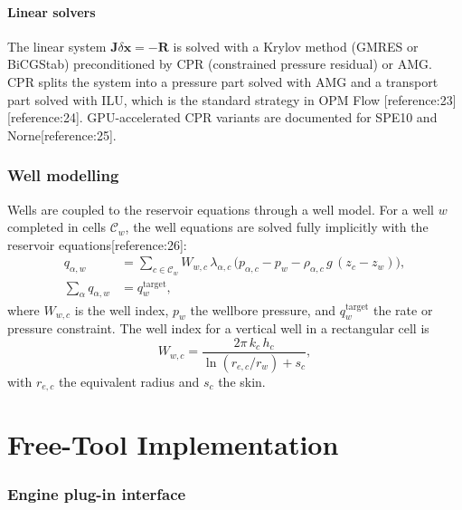 \documentclass[10pt,a4paper]{article}
\begin{document}
\subsection{Linear solvers}

The linear system $\bm{J}\delta\bm{x}=-\bm{R}$ is solved with a Krylov method
(GMRES or BiCGStab) preconditioned by CPR (constrained pressure residual) or
AMG. CPR splits the system into a pressure part solved with AMG and a
transport part solved with ILU, which is the standard strategy in OPM Flow
[reference:23][reference:24]. GPU-accelerated CPR variants are documented for
SPE10 and Norne[reference:25].

\section{Well modelling}

Wells are coupled to the reservoir equations through a well model. For a well
$w$ completed in cells $\mathcal{C}_w$, the well equations are solved fully
implicitly with the reservoir equations[reference:26]:
\begin{align}
  q_{\alpha,w} &= \sum_{c\in\mathcal{C}_w} W_{w,c}\,\lambda_{\alpha,c}\,
  \bigl(p_{\alpha,c} - p_{w} - \rho_{\alpha,c}\,g\,(z_c-z_w)\bigr), \label{eq:well-rate}\\
  \sum_{\alpha} q_{\alpha,w} &= q_{w}^{\mathrm{target}}, \label{eq:well-constraint}
\end{align}
where $W_{w,c}$ is the well index, $p_w$ the wellbore pressure, and
$q_w^{\mathrm{target}}$ the rate or pressure constraint. The well index for a
vertical well in a rectangular cell is
\begin{equation}
  W_{w,c} = \frac{2\pi\,k_c\,h_c}
  {\ln(r_{e,c}/r_w) + s_c},
  \label{eq:well-index}
\end{equation}
with $r_{e,c}$ the equivalent radius and $s_c$ the skin.

\part{Free-Tool Implementation}

\section{Engine plug-in interface}
\end{document}
